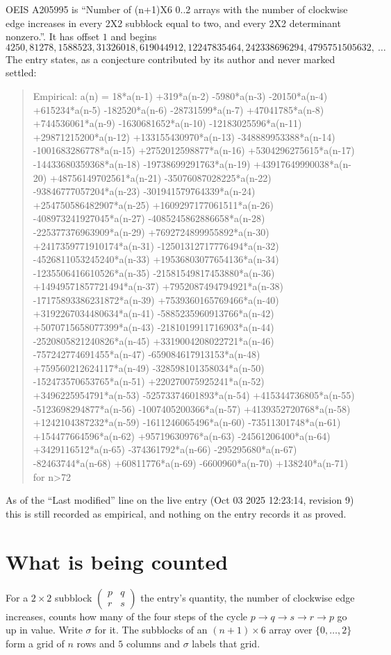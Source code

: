 \documentclass[11pt,a4paper]{article}
\theoremstyle{plain}
\theoremstyle{definition}
\begin{document}
OEIS A205995 is ``Number of (n+1)X6 0..2 arrays with the number of clockwise edge increases in every 2X2 subblock equal to two, and every 2X2 determinant nonzero.''. It has offset $1$ and begins
\[
4250, 81278, 1588523, 31326018, 619044912, 12247835464, 242338696294, 4795751505632,\ \dots
\]
The entry states, as a conjecture contributed by its author and never marked settled:
\begin{quote}
Empirical: a(n) = 18*a(n-1) +319*a(n-2) -5980*a(n-3) -20150*a(n-4) +615234*a(n-5) -182520*a(n-6) -28731599*a(n-7) +47041785*a(n-8) +744536061*a(n-9) -1630681652*a(n-10) -12183025596*a(n-11) +29871215200*a(n-12) +133155430970*a(n-13) -348889953388*a(n-14) -1001683286778*a(n-15) +2752012598877*a(n-16) +5304296275615*a(n-17) -14433680359368*a(n-18) -19738699291763*a(n-19) +43917649990038*a(n-20) +48756149702561*a(n-21) -35076087028225*a(n-22) -93846777057204*a(n-23) -301941579764339*a(n-24) +254750586482907*a(n-25) +1609297177061511*a(n-26) -408973241927045*a(n-27) -4085245862886658*a(n-28) -225377376963909*a(n-29) +7692724899955892*a(n-30) +2417359771910174*a(n-31) -12501312717776494*a(n-32) -4526811053245240*a(n-33) +19536803077654136*a(n-34) -1235506416610526*a(n-35) -21581549817453880*a(n-36) +14949571857721494*a(n-37) +7952087494794921*a(n-38) -17175893386231872*a(n-39) +7539360165769466*a(n-40) +3192267034480634*a(n-41) -5885235960913766*a(n-42) +5070715658077399*a(n-43) -2181019911716903*a(n-44) -2520805821240826*a(n-45) +3319004208022721*a(n-46) -757242774691455*a(n-47) -659084617913153*a(n-48) +759560212624117*a(n-49) -328598101358034*a(n-50) -152473570653765*a(n-51) +220270075925241*a(n-52) +3496225954791*a(n-53) -52573374601893*a(n-54) +415344736805*a(n-55) -5123698294877*a(n-56) -1007405200366*a(n-57) +4139352720768*a(n-58) +1242104387232*a(n-59) -1611246065496*a(n-60) -73511301748*a(n-61) +154477664596*a(n-62) +95719630976*a(n-63) -24561206400*a(n-64) +3429116512*a(n-65) -374361792*a(n-66) -295295680*a(n-67) -82463744*a(n-68) +60811776*a(n-69) -6600960*a(n-70) +138240*a(n-71) for n>72
\end{quote}
As of the ``Last modified'' line on the live entry (Oct 03 2025 12:23:14, revision 9) this is still
recorded as empirical, and nothing on the entry records it as proved.

\section{What is being counted}

For a $2\times2$ subblock $\begin{pmatrix}p&q\\r&s\end{pmatrix}$ the
entry's quantity, the number of clockwise edge increases, counts how many of the four steps of the cycle $p\to q\to s\to r\to p$ go up in value. Write $\sigma$ for it. The subblocks of an
$(n+1)\times6$ array over $\{0,\dots,2\}$ form a grid of $n$ rows and $5$
columns and $\sigma$ labels that grid.
\end{document}

